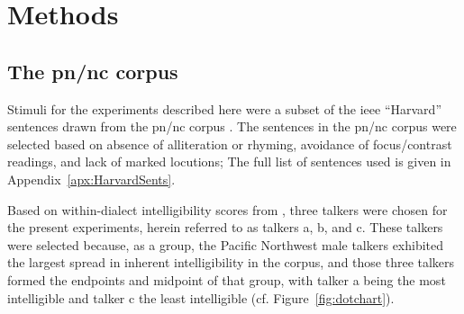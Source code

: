 \chapter{Methods\label{chap:Methods}}

\section{The \ac{pn/nc} corpus}
Stimuli for the experiments described here were a subset of the \ac{ieee} “Harvard” sentences \citep{HarvardSents} drawn from the \ac{pn/nc} corpus \citep{xxx}.  The sentences in the \ac{pn/nc} corpus were selected based on absence of alliteration or rhyming, avoidance of focus/contrast readings, and lack of marked locutions; The full list of sentences used is given in Appendix~\ref{apx:HarvardSents}.  

Based on within-dialect intelligibility scores from \citet{McCloyEtAl2013}, three talkers were chosen for the present experiments, herein referred to as talkers \ac{a}, \ac{b}, and \ac{c}.  These talkers were selected because, as a group, the Pacific Northwest male talkers exhibited the largest spread in inherent intelligibility in the corpus, and those three talkers formed the endpoints and midpoint of that group, with talker \ac{a} being the most intelligible and talker \ac{c} the least intelligible (cf. Figure~\ref{fig:dotchart}).

